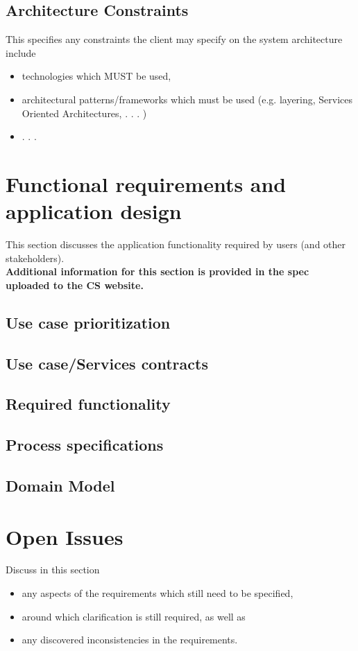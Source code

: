 \documentclass[a4paper,12pt]{article}
\begin{document}
\subsection{Architecture Constraints}

This specifies any constraints the client may specify on the system architecture include
\begin{itemize}
\item technologies which MUST be used,
\item architectural patterns/frameworks which must be used (e.g. layering, Services Oriented Architectures, . . . )
\item . . .
\end{itemize}

\section{Functional requirements and application design}
This section discusses the application functionality required by users (and other stakeholders).\\
\textbf{Additional information for this section is provided in the spec uploaded to the CS website.}

\subsection{Use case prioritization}

\subsection{Use case/Services contracts}

\subsection{Required functionality}

\subsection{Process specifications}

\subsection{Domain Model}

\section{Open Issues}

Discuss in this section
\begin{itemize}
\item any aspects of the requirements which still need to be specified,
\item around which clarification is still required, as well as
\item any discovered inconsistencies in the requirements.
\end{itemize}
\end{document}
